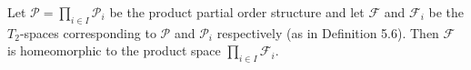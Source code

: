 Let $\mathcal{P} = \prod_{i \in I} \mathcal{P}_i$ be the product partial order structure and let $\mathcal{F}$ and $\mathcal{F}_i$ be the $T_2$-spaces corresponding to $\mathcal{P}$ and $\mathcal{P}_i$ respectively (as in Definition 5.6). Then $\mathcal{F}$ is homeomorphic to the product space $\prod_{i \in I} \mathcal{F}_i$.
